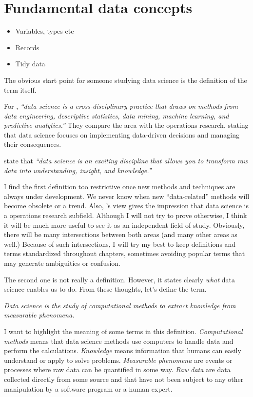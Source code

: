 \chapter{Fundamental data concepts}
\label{chap:data}

\begin{itemize}
  \item Variables, types etc
  \item Records
  \item Tidy data
\end{itemize}

The obvious start point for someone studying data science is the definition of the term
itself.

For \textcite{Zumel2019}, \emph{``data science is a cross-disciplinary practice that draws
on methods from data engineering, descriptive statistics, data mining, machine learning,
and predictive analytics.''}  They compare the area with the operations research, stating
that data science focuses on implementing data-driven decisions and managing their
consequences.

\textcite{Hickham2023} state that \emph{``data science is an exciting discipline that
allows you to transform raw data into understanding, insight, and knowledge.''}

I find the first definition too restrictive once new methods and techniques are always
under development.  We never know when new ``data-related'' methods will become obsolete
or a trend.  Also, \textcite{Zumel2019}'s view gives the impression that data science is a
operations research subfield.  Although I will not try to prove otherwise, I think it will
be much more useful to see it as an independent field of study.  Obviously, there will be
many intersections between both areas (and many other areas as well.)  Because of such
intersections, I will try my best to keep definitions and
terms standardized throughout chapters, sometimes avoiding popular terms that may generate
ambiguities or confusion.

The second one is not really a definition.  However, it states clearly \emph{what} data
science enables us to do.  From these thoughts, let's define the term.

\begin{displayquote}
  \em
  Data science is the study of computational methods to extract knowledge from
  measurable phenomena.
\end{displayquote}

I want to highlight the meaning of some terms in this definition.  \emph{Computational methods} means
that data science methods use computers to handle data and perform the calculations.
\emph{Knowledge} means information that humans can easily understand or apply to solve
problems.  \emph{Measurable phenomena} are events or processes where raw data can be
quantified in some way.  \emph{Raw data} are data collected directly from some source and
that have not been subject to any other manipulation by a software program or a human
expert.

